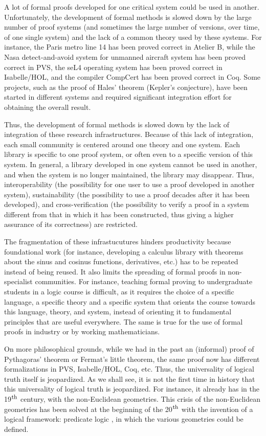 A lot of formal proofs developed for one critical system could be used
in another.  Unfortunately, the development of formal methods is
slowed down by the large number of proof systems (and sometimes the
large number of versions, over time, of one single system) and the
lack of a common theory used by these systems.  For instance, the
Paris metro line 14 has been proved correct in Atelier B, while the
Nasa detect-and-avoid system for unmanned aircraft system has been
proved correct in PVS, the seL4 operating system has been proved
correct in Isabelle/HOL, and the compiler CompCert has been proved
correct in Coq.  Some projects, such as the proof of Hales' theorem
(Kepler's conjecture), have been started in different
systems and required significant integration effort for obtaining the
overall result.

Thus, the development of formal methods is slowed down by the lack of
integration of these research infrastructures.  Because of this lack
of integration, each small community is centered around one theory and
one system. Each library is specific to one proof system, or often
even to a specific version of this system. In general, a library
developed in one system cannot be used in another, and when the system
is no longer maintained, the library may disappear.  Thus,
interoperability (the possibility for one user to use a proof
developed in another system), sustainability (the possibility to use a
proof decades after it has been developed), and cross-verification
(the possibility to verify a proof in a system different from that in
which it has been constructed, thus giving a higher assurance of its
correctness) are restricted.

The fragmentation of these infrastucutures hinders productivity
because foundational work (for instance, developing a calculus library
with theorems about the sinus and cosinus functions, derivatives,
etc.) has to be repeated instead of being reused.  It also limits the
spreading of formal proofs in non-specialist communities. For
instance, teaching formal proving to undergraduate students in a logic
course is difficult, as it requires the choice of a specific language,
a specific theory and a specific system that orients the course
towards this language, theory, and system, instead of orienting it to
fundamental principles that are useful everywhere. The same is true
for the use of formal proofs in industry or by working mathematicians.

On more philosophical grounds, while we had in the past an (informal)
proof of Pythagoras' theorem or Fermat's little theorem, the same
proof now has different formalizations in PVS, Isabelle/HOL, Coq, etc.
Thus, the universality of logical truth itself is jeopardized.  As we
shall see, it is not the first time in history that this universality
of logical truth is jeopardized. For instance, it already has in the
19$^{\mbox{\footnotesize th}}$ century, with the non-Euclidean
geometries. This crisis of the non-Euclidean geometries has been
solved at the beginning of the 20$^{\mbox{\footnotesize th}}$ with the
invention of a logical framework: predicate logic
\cite{HilbertAckermann}, in which the various geometries could be
defined.


